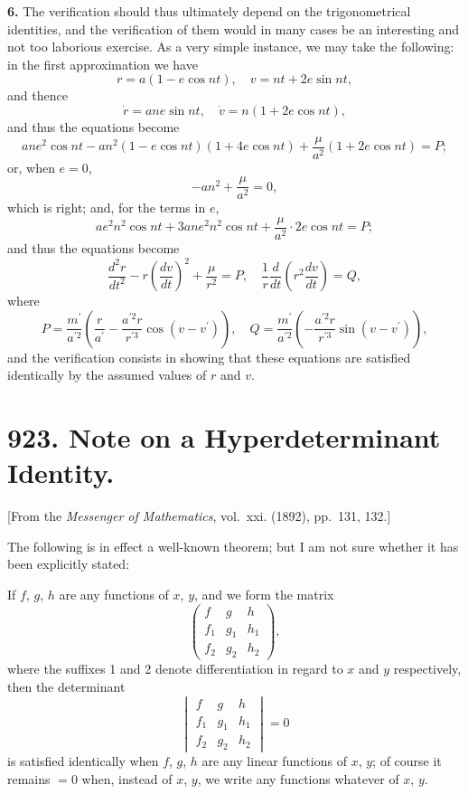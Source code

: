 \documentclass[11pt,a4paper]{book}
\begin{document}
\textbf{6.} The verification should thus ultimately depend on the trigonometrical
identities, and the verification of them would in many cases be an interesting and
not too laborious exercise. As a very simple instance, we may take the following:
in the first approximation we have
\[
r = a(1 - e\cos nt), \quad v = nt + 2e\sin nt,
\]
and thence
\[
\dot{r} = ane\sin nt, \quad \dot{v} = n(1 + 2e\cos nt),
\]
and thus the equations become
\[
ane^2\cos nt - an^2(1 - e\cos nt)(1 + 4e\cos nt) + \frac{\mu}{a^2}(1 + 2e\cos nt) = P;
\]
or, when $e = 0$,
\[
-an^2 + \frac{\mu}{a^2} = 0,
\]
which is right; and, for the terms in $e$,
\[
ae^2n^2\cos nt + 3ane^2n^2\cos nt + \frac{\mu}{a^2}\cdot 2e\cos nt = P;
\]
and thus the equations become
\[
\frac{d^2r}{dt^2} - r\left(\frac{dv}{dt}\right)^2 + \frac{\mu}{r^2} = P, \quad
\frac{1}{r}\frac{d}{dt}\left(r^2\frac{dv}{dt}\right) = Q,
\]
where
\[
P = \frac{m^\prime}{a^{\prime 2}}\left(\frac{r}{a^{\prime}} - \frac{a^{\prime 2}r}{r^{\prime 3}}\cos(v - v^\prime)\right), \quad
Q = \frac{m^\prime}{a^{\prime 2}}\left(-\frac{a^{\prime 2}r}{r^{\prime 3}}\sin(v - v^\prime)\right),
\]
and the verification consists in showing that these equations are satisfied identically
by the assumed values of $r$ and $v$.



\newpage
\section*{923. Note on a Hyperdeterminant Identity.}

[From the \textit{Messenger of Mathematics}, vol.~xxi. (1892), pp.~131, 132.]

\bigskip

The following is in effect a well-known theorem; but I am not sure whether
it has been explicitly stated:

If $f$, $g$, $h$ are any functions of $x$, $y$, and we form the matrix
\[
\begin{pmatrix}
f & g & h\\
f_1 & g_1 & h_1\\
f_2 & g_2 & h_2
\end{pmatrix},
\]
where the suffixes 1 and 2 denote differentiation in regard to $x$ and $y$ respectively,
then the determinant
\[
\begin{vmatrix}
f & g & h\\
f_1 & g_1 & h_1\\
f_2 & g_2 & h_2
\end{vmatrix}
= 0
\]
is satisfied identically when $f$, $g$, $h$ are any linear functions of $x$, $y$; of course it
remains $=0$ when, instead of $x$, $y$, we write any functions whatever of $x$, $y$.
\end{document}
